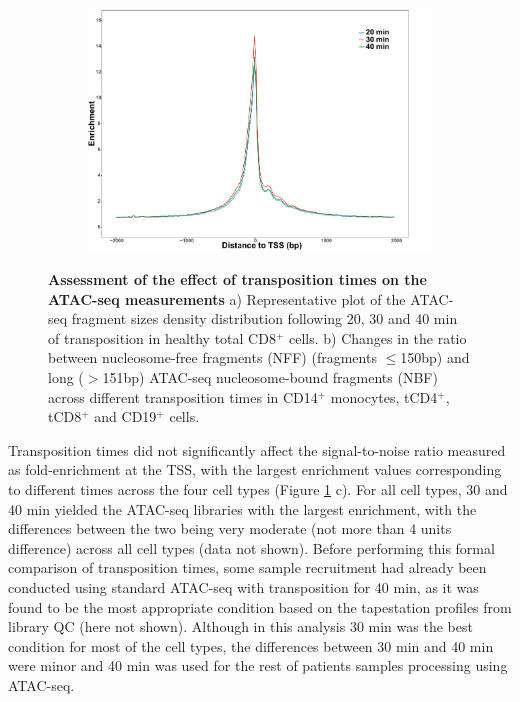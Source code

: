 \begin{figure}[htbp]
\begin{subfigure}{0.5\textwidth}
\centering
\includegraphics[width=\textwidth]{./Results1/pdfs/ATAC_optimisation_CD4_20_30_40_min_tss_enrichment}
\caption{\textbf{}} %
\end{subfigure}
\caption[Assessment of the effect of transposition times on the ATAC-seq measurements]{\textbf{Assessment of the effect of transposition times on the ATAC-seq measurements} a) Representative plot of the ATAC-seq fragment sizes density distribution following 20, 30 and 40 min of transposition in healthy total CD8$^+$ cells. b) Changes in the ratio between nucleosome-free fragments (NFF) (fragments $\leq$150bp) and long ($>$151bp) ATAC-seq nucleosome-bound fragments (NBF) across different transposition times in CD14$^+$ monocytes, tCD4$^+$, tCD8$^+$ and CD19$^+$ cells.}
\label{figure:Transposition_times_ATAC}
\end{figure} 

Transposition times did not significantly affect the signal-to-noise ratio measured as fold-enrichment at the TSS, with the largest enrichment values corresponding to different times across the four cell types (Figure \ref{figure:Transposition_times_ATAC} c). For all cell types, 30 and 40 min yielded the ATAC-seq libraries with the largest enrichment, with the differences between the two being very moderate (not more than 4 units difference) across all cell types (data not shown). Before performing this formal comparison of transposition times, some sample recruitment had already been conducted using standard ATAC-seq with transposition for 40 min, as it was found to be the most appropriate condition based on the tapestation profiles from library QC (here not shown). Although in this analysis 30 min was the best condition for most of the cell types, the differences between 30 min and 40 min were minor and 40 min was used for the rest of patients samples processing using ATAC-seq. 


